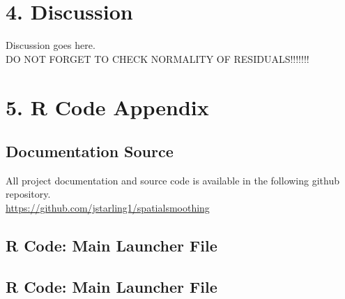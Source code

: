 \documentclass[11pt]{article}
\newcommand{\myindent}{\hspace*{1cm}}
\begin{document}
\section{4. Discussion}

Discussion goes here. \\

DO NOT FORGET TO CHECK NORMALITY OF RESIDUALS!!!!!!!\\

\newpage
\section{5. R Code Appendix}

\subsection{Documentation Source}
All project documentation and source code is available in the following github repository. \\

\myindent \underline{https://github.com/jstarling1/spatialsmoothing}

\subsection{R Code: Main Launcher File}


\subsection{R Code: Main Launcher File}


% 
% 
% 
% 
% 
\end{document}
